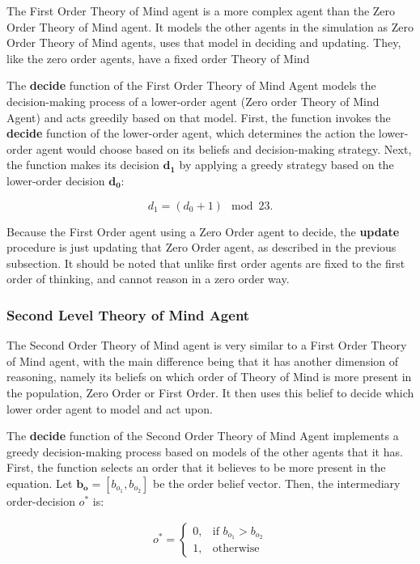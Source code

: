 The First Order Theory of Mind agent is a more complex agent than the Zero Order Theory of Mind agent. It models the other agents in the simulation as Zero Order Theory of Mind agents, uses that model in deciding and updating. They, like the zero order agents, have a fixed order Theory of Mind

The \textbf{decide} function of the First Order Theory of Mind Agent models the decision-making process of a lower-order agent (Zero order Theory of Mind Agent) and acts greedily based on that model. First, the function invokes the \textbf{decide} function of the lower-order agent, which determines the action the lower-order agent would choose based on its beliefs and decision-making strategy. Next, the function makes its decision $\mathbf{d_1}$ by applying a greedy strategy based on the lower-order decision \hyperref[eq:zero-order-decide]{$\mathbf{d_0}$}:

\[
d_1 = (d_0 + 1) \mod 23.
\]

Because the First Order agent using a Zero Order agent to decide, the \textbf{update} procedure is just updating that Zero Order agent, as described in the previous subsection. It should be noted that unlike \cite{veltman2019training} first order agents are fixed to the first order of thinking, and cannot reason in a zero order way.

\subsubsection{Second Level Theory of Mind Agent}

The Second Order Theory of Mind agent is very similar to a First Order Theory of Mind agent, with the main difference being that it has another dimension of reasoning, namely its beliefs on which order of Theory of Mind is more present in the population, Zero Order or First Order. It then uses this belief to decide which lower order agent to model and act upon. 

The \textbf{decide} function of the Second Order Theory of Mind Agent implements a greedy decision-making process based on models of the other agents that it has. First, the function selects an order that it believes to be more present in the equation. Let $\mathbf{b_o} = [b_{o_{1}}, b_{o_{2}}]$ be the order belief vector. Then, the intermediary order-decision $o^*$ is:

\[
\begin{aligned}
\text{{$o^*$}} =
\begin{cases}
0, & \text{{if }} b_{o_{1}} > b_{o_{2}}\\
1, & \text{{otherwise}}
\end{cases}
\end{aligned}
\]

